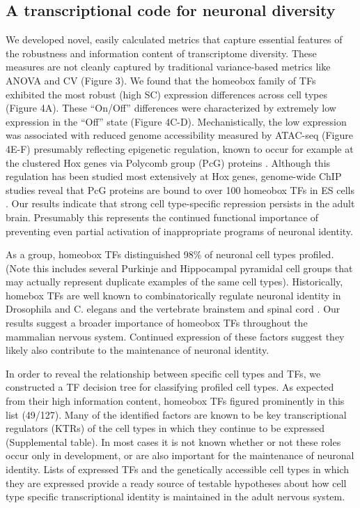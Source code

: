 \subsection{A transcriptional code for neuronal diversity}
We developed novel, easily calculated metrics that capture essential features of the robustness and information content of transcriptome diversity. These measures are not cleanly captured by traditional variance-based metrics like ANOVA and CV (Figure 3). We found that the homeobox family of TFs exhibited the most robust (high SC) expression differences across cell types (Figure 4A). These “On/Off” differences were characterized by extremely low expression in the “Off” state (Figure 4C-D). Mechanistically, the low expression was associated with reduced genome accessibility measured by ATAC-seq (Figure 4E-F) presumably reflecting epigenetic regulation, known to occur for example at the clustered Hox genes via Polycomb group (PcG) proteins \cite{Montavon_2014}. Although this regulation has been studied most extensively at Hox genes, genome-wide ChIP studies reveal that PcG proteins are bound to over 100 homeobox TFs in ES cells \cite{Boyer_2006}. Our results indicate that strong cell type-specific repression persists in the adult brain. Presumably this represents the continued functional importance of preventing even partial activation of inappropriate programs of neuronal identity. 

As a group, homeobox TFs distinguished 98\% of neuronal cell types profiled. (Note this includes several Purkinje and Hippocampal pyramidal cell groups that may actually represent duplicate examples of the same cell types). Historically, homebox TFs are well known to combinatorically regulate neuronal identity in Drosophila and C. elegans \cite{Kratsios_2017} and the vertebrate brainstem and spinal cord \cite{Dasen_2009,Philippidou_2013}. Our results suggest a broader importance of homeobox TFs throughout the mammalian nervous system. Continued expression of these factors suggest they likely also contribute to the maintenance of neuronal identity.

In order to reveal the relationship between specific cell types and TFs, we constructed a TF decision tree for classifying profiled cell types. As expected from their high information content, homeobox TFs figured prominently in this list (49/127). Many of the identified factors are known to be key transcriptional regulators (KTRs) of the cell types in which they continue to be expressed (Supplemental table). In most cases it is not known whether or not these roles occur only in development, or are also important for the maintenance of neuronal identity. Lists of expressed TFs and the genetically accessible cell types in which they are expressed provide a ready source of testable hypotheses about how cell type specific transcriptional identity is maintained in the adult nervous system.

